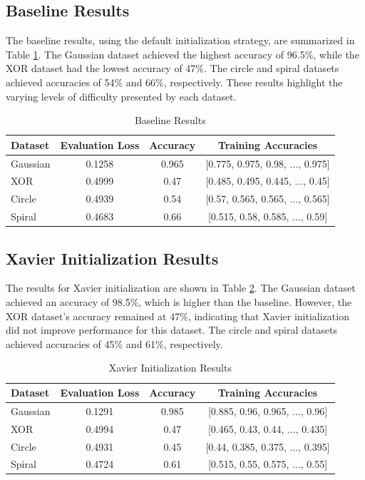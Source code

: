 \documentclass{article} %
\begin{document}
\subsection{Baseline Results}
The baseline results, using the default initialization strategy, are summarized in Table \ref{tab:baseline_results}. The Gaussian dataset achieved the highest accuracy of 96.5\%, while the XOR dataset had the lowest accuracy of 47\%. The circle and spiral datasets achieved accuracies of 54\% and 66\%, respectively. These results highlight the varying levels of difficulty presented by each dataset.

\begin{table}[h]
    \centering
    \caption{Baseline Results}
    \label{tab:baseline_results}
    \begin{tabular}{lccc}
        \toprule
        Dataset & Evaluation Loss & Accuracy & Training Accuracies \\
        \midrule
        Gaussian & 0.1258 & 0.965 & [0.775, 0.975, 0.98, ..., 0.975] \\
        XOR & 0.4999 & 0.47 & [0.485, 0.495, 0.445, ..., 0.45] \\
        Circle & 0.4939 & 0.54 & [0.57, 0.565, 0.565, ..., 0.565] \\
        Spiral & 0.4683 & 0.66 & [0.515, 0.58, 0.585, ..., 0.59] \\
        \bottomrule
    \end{tabular}
\end{table}

\subsection{Xavier Initialization Results}
The results for Xavier initialization are shown in Table \ref{tab:xavier_results}. The Gaussian dataset achieved an accuracy of 98.5\%, which is higher than the baseline. However, the XOR dataset's accuracy remained at 47\%, indicating that Xavier initialization did not improve performance for this dataset. The circle and spiral datasets achieved accuracies of 45\% and 61\%, respectively.

\begin{table}[h]
    \centering
    \caption{Xavier Initialization Results}
    \label{tab:xavier_results}
    \begin{tabular}{lccc}
        \toprule
        Dataset & Evaluation Loss & Accuracy & Training Accuracies \\
        \midrule
        Gaussian & 0.1291 & 0.985 & [0.885, 0.96, 0.965, ..., 0.96] \\
        XOR & 0.4994 & 0.47 & [0.465, 0.43, 0.44, ..., 0.435] \\
        Circle & 0.4931 & 0.45 & [0.44, 0.385, 0.375, ..., 0.395] \\
        Spiral & 0.4724 & 0.61 & [0.515, 0.55, 0.575, ..., 0.55] \\
        \bottomrule
    \end{tabular}
\end{table}
\end{document}
